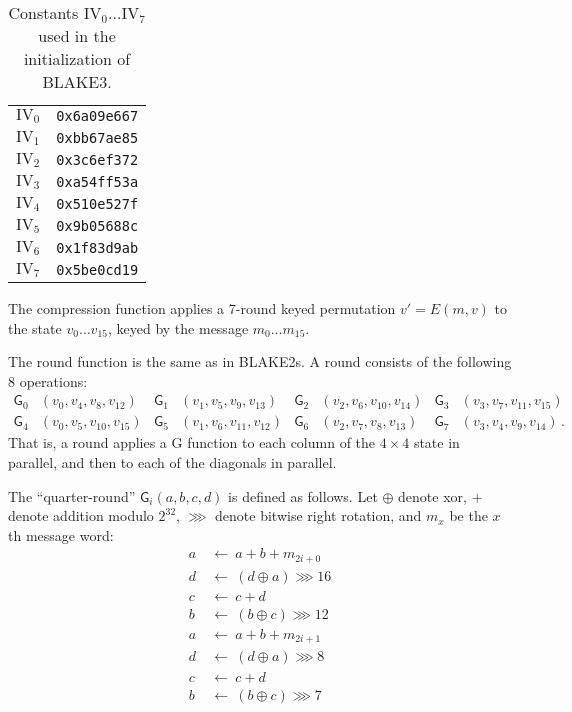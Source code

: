\documentclass[11pt,notitlepage,a4paper]{article}
\newcommand{\GG}{\mathsf{G}}
\newcommand{\IV}{\text{IV}}
\begin{document}
\begin{table}
  \caption{Constants $\IV_0\dots\IV_7$ used in the initialization of BLAKE3.}%
  \label{tab:constants}
  \centering
  \begin{tabular}{cc}
    \toprule
    $\IV_0$ & \texttt{0x6a09e667} \\
    $\IV_1$ & \texttt{0xbb67ae85} \\
    $\IV_2$ & \texttt{0x3c6ef372} \\
    $\IV_3$ & \texttt{0xa54ff53a} \\
    $\IV_4$ & \texttt{0x510e527f} \\
    $\IV_5$ & \texttt{0x9b05688c} \\
    $\IV_6$ & \texttt{0x1f83d9ab} \\
    $\IV_7$ & \texttt{0x5be0cd19} \\
    \bottomrule
  \end{tabular}
\end{table}

The compression function applies a 7-round keyed permutation $v' = E(m, v)$ to
the state $v_0 \dots v_{15}$, keyed by the message $m_0 \dots m_{15}$. 

The round function is the same as in BLAKE2s. A round consists of the following 8 operations:
\begin{align*}
\GG_{0}&(v_{0}, v_{4}, v_{8}, v_{12}) &
\GG_{1}&(v_{1}, v_{5}, v_{9}, v_{13}) &
\GG_{2}&(v_{2}, v_{6}, v_{10}, v_{14}) &
\GG_{3}&(v_{3}, v_{7}, v_{11}, v_{15}) \\
\GG_{4}&(v_{0}, v_{5}, v_{10}, v_{15}) &
\GG_{5}&(v_{1}, v_{6}, v_{11}, v_{12}) &
\GG_{6}&(v_{2}, v_{7}, v_{8}, v_{13}) &
\GG_{7}&(v_{3}, v_{4}, v_{9}, v_{14})\,.
\end{align*}
That is, a round applies a G function to each column of the $4\times 4$ state in parallel,
and then to each of the diagonals in parallel. 

The ``quarter-round'' $\GG_i(a, b, c, d)$ is
defined as follows. Let $\oplus$ denote xor, $+$ denote addition modulo $2^{32}$, $\ggg$ denote
bitwise right rotation, and $m_{x}$ be the $x$th message word:
\begin{align*}
a \ & \leftarrow \ a + b + m_{2i+0} \\
d \ & \leftarrow \ (d \oplus a) \ggg 16 \\
c \ & \leftarrow \ c + d \\
b \ & \leftarrow \ (b \oplus c) \ggg 12 \\
a \ & \leftarrow \ a + b + m_{2i+1} \\
d \ & \leftarrow \ (d \oplus a) \ggg 8 \\
c \ & \leftarrow \ c + d \\
b \ & \leftarrow \ (b \oplus c) \ggg 7
\end{align*}
\end{document}
